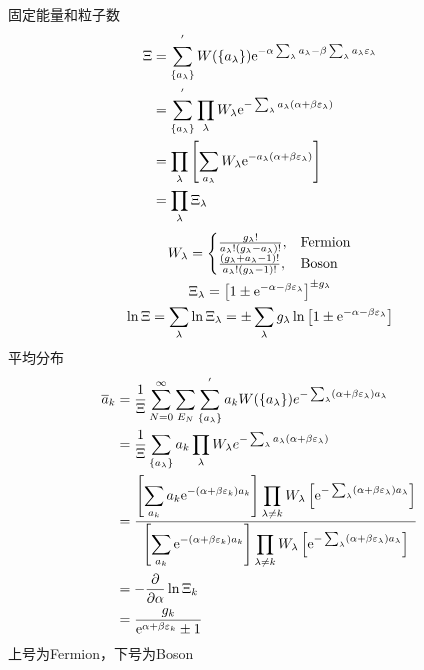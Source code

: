 固定能量和粒子数
\begin{align*}
    \Xi &= \sum_{\{a_{\lambda}\}}^{'} W(\{a_{\lambda}\}) \mathrm{e}^{-\alpha \sum_{\lambda} a_{\lambda} - \beta \sum_{\lambda} a_{\lambda} \varepsilon_{\lambda}}
    \\
    &= \sum_{\{a_{\lambda}\}}^{'} \prod_{\lambda} W_{\lambda} \mathrm{e}^{-\sum_{\lambda} a_{\lambda} (\alpha + \beta \varepsilon_{\lambda})}
    \\
    &= \prod_{\lambda} \left[\sum_{a_{\lambda}} W_{\lambda} \mathrm{e}^{-a_{\lambda} (\alpha + \beta \varepsilon_{\lambda})}\right]
    \\
    &= \prod_{\lambda} \Xi_{\lambda}
\end{align*}
\begin{gather*}
    W_{\lambda} = 
    \begin{cases}
        \frac{g_{\lambda}!}{a_{\lambda}! (g_{\lambda} - a_{\lambda})!}, & \text{Fermion} \\
        \frac{(g_{\lambda} + a_{\lambda} - 1)!}{a_{\lambda}! (g_{\lambda} - 1)!}, & \text{Boson} \\
    \end{cases}
    \\
    \Xi_{\lambda} = \left[1 \pm \mathrm{e}^{-\alpha - \beta \varepsilon_{\lambda}}\right]^{\pm g_{\lambda}}
    \\
    \ln \Xi = \sum_{\lambda} \ln \Xi_{\lambda} = \pm \sum_{\lambda} g_{\lambda} \ln\left[1 \pm \mathrm{e}^{-\alpha - \beta \varepsilon_{\lambda}}\right]
\end{gather*}
平均分布
\begin{align*}
    \overline{a}_{k} &= \frac{1}{\Xi} \sum_{N=0}^{\infty} \sum_{E_N} \sum_{\{a_{\lambda}\}}^{'} a_k W(\{a_{\lambda}\}) e^{-\sum_{\lambda} (\alpha + \beta \varepsilon_{\lambda}) a_{\lambda}}
    \\
    &= \frac{1}{\Xi} \sum_{\{a_{\lambda}\}} a_k \prod_{\lambda} W_{\lambda} e^{-\sum_{\lambda} a_{\lambda} (\alpha + \beta \varepsilon_{\lambda})}
    \\
    &= \frac{\displaystyle \left[\sum_{a_k} a_k \mathrm{e}^{-(\alpha + \beta \varepsilon_k)a_k} \right]\prod_{\lambda \neq k} W_{\lambda} \left[\mathrm{e}^{-\sum_{\lambda} (\alpha + \beta \varepsilon_{\lambda}) a_{\lambda}}\right]}{\displaystyle \left[\sum_{a_k} \mathrm{e}^{-(\alpha + \beta \varepsilon_k)a_k} \right]\prod_{\lambda \neq k} W_{\lambda} \left[\mathrm{e}^{-\sum_{\lambda} (\alpha + \beta \varepsilon_{\lambda}) a_{\lambda}}\right]}
    \\
    &= -\frac{\partial }{\partial \alpha} \ln \Xi_k
    \\
    &= \frac{g_k}{\mathrm{e}^{\alpha + \beta \varepsilon_k} \pm 1}
\end{align*}
上号为Fermion，下号为Boson